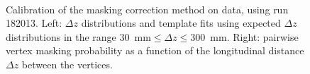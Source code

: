 \begin{figure}[p]
{	}\\
	\caption{Calibration of the masking correction method on data, using run 182013. Left: $\Delta z$ distributions and template fits using expected $\Delta z$ distributions in the range $30$~mm$\leq\Delta z\leq300$~mm. Right: pairwise vertex masking probability as a function of the longitudinal distance $\Delta z$ between the vertices.}
	\label{fig:masking-correction-data}
\end{figure}

\begin{figure}[p]
	\centering
\end{figure}
